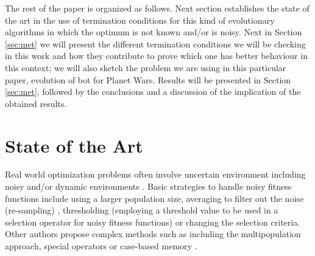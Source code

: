 \documentclass[runningheads,a4paper]{llncs}
\begin{document}
The rest of the paper is organized as follows. Next section
establishes the state of the art in the use of termination conditions
for this kind of evolutionary algorithms in which the optimum is not
known and/or is noisy. Next in Section \ref{sec:met} we will %
present the different termination
conditions %
we will be checking in this work and how they contribute to
prove which one has better behaviour in this context; we will also
sketch the problem we are using in this particular paper, evolution of
bot for Planet Wars. Results will be presented in Section
\ref{sec:met}, followed by the conclusions and a discussion of the
implication of the obtained results.



\section{State of the Art}
\label{sec:SoA}


Real world optimization problems often involve uncertain environment including noisy and/or dynamic environments \cite{Jin2005303,QianYZ13}.
Basic strategies to handle noisy fitness functions include using a larger population size, averaging to filter out the noise (re-sampling) \cite{Branke98,Branke2001}, thresholding (employing a threshold value to be used in a selection operator for noisy fitness functions) \cite{Markon2001} or changing the selection criteria.
Other authors propose complex methods such as including the multipopulation approach, special operators or case-based memory \cite{BhattacharyaIM14}. 
\end{document}
